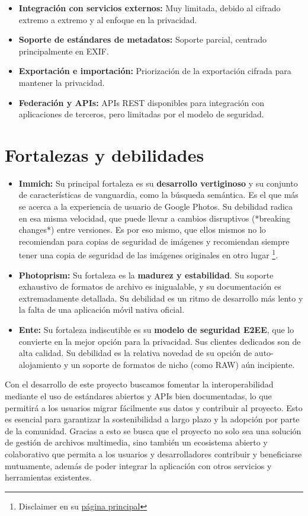 \begin{itemize}
    \item \textbf{Integración con servicios externos:} Muy limitada, debido al cifrado extremo a extremo y al enfoque en la privacidad.
    \item \textbf{Soporte de estándares de metadatos:} Soporte parcial, centrado principalmente en EXIF.
    \item \textbf{Exportación e importación:} Priorización de la exportación cifrada para mantener la privacidad.
    \item \textbf{Federación y APIs:} APIs REST disponibles para integración con aplicaciones de terceros, pero limitadas por el modelo de seguridad.
\end{itemize}

\section{Fortalezas y debilidades}
\begin{itemize}
    \item \textbf{Immich:} Su principal fortaleza es su \textbf{desarrollo vertiginoso} y su conjunto de características de vanguardia, como la búsqueda semántica. Es el que más se acerca a la experiencia de usuario de Google Photos. Su debilidad radica en esa misma velocidad, que puede llevar a cambios disruptivos (*breaking changes*) entre versiones. Es por eso mismo, que ellos mismos no lo recomiendan para copias de seguridad de imágenes y recomiendan siempre tener una copia de seguridad de las imágenes originales en otro lugar \footnote{Disclaimer en su \href{https://immich.app/}{página principal}}.
    \item \textbf{Photoprism:} Su fortaleza es la \textbf{madurez y estabilidad}. Su soporte exhaustivo de formatos de archivo es inigualable, y su documentación es extremadamente detallada. Su debilidad es un ritmo de desarrollo más lento y la falta de una aplicación móvil nativa oficial.
    \item \textbf{Ente:} Su fortaleza indiscutible es su \textbf{modelo de seguridad E2EE}, que lo convierte en la mejor opción para la privacidad. Sus clientes dedicados son de alta calidad. Su debilidad es la relativa novedad de su opción de auto-alojamiento y un soporte de formatos de nicho (como RAW) aún incipiente.
\end{itemize}


Con el desarrollo de este proyecto buscamos fomentar la interoperabilidad mediante el uso de estándares abiertos y APIs bien documentadas, lo que permitirá a los usuarios migrar fácilmente sus datos y contribuir al proyecto. Esto es esencial para garantizar la sostenibilidad a largo plazo y la adopción por parte de la comunidad.
Gracias a esto se busca que el proyecto no solo sea una solución de gestión de archivos multimedia, sino también un ecosistema abierto y colaborativo que permita a los usuarios y desarrolladores contribuir y beneficiarse mutuamente, además de poder integrar la aplicación con otros servicios y herramientas existentes.

